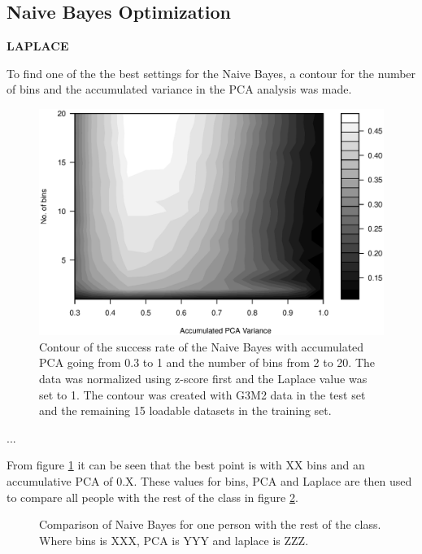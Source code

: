 \subsection{Naive Bayes Optimization}
\textbf{LAPLACE}

To find one of the the best settings for the Naive Bayes, a contour for the number of bins and the accumulated variance in the PCA analysis was made.

\begin{figure}[H]
\centering
\includegraphics[width = \textwidth]{graphics/contour_bins_vs_pca}
\caption{Contour of the success rate of the Naive Bayes with accumulated PCA going from 0.3 to 1 and the number of bins from 2 to 20.
The data was normalized using z-score first and the Laplace value was set to 1.
The contour was created with G3M2 data in the test set and the remaining 15 loadable datasets in the training set.}
\label{fig:contour_bin-vs-pca}
\end{figure}

...

From figure \ref{fig:contour_bin-vs-pca} it can be seen that the best point is with XX bins and an accumulative PCA of 0.X.
These values for bins, PCA and Laplace are then used to compare all people with the rest of the class in figure \ref{fig:comp_naiveBayes}.

\begin{figure}[H]
\centering
\caption{Comparison of Naive Bayes for one person with the rest of the class.
Where bins is XXX, PCA is YYY and laplace is ZZZ.}
\label{fig:comp_naiveBayes}
\end{figure}






